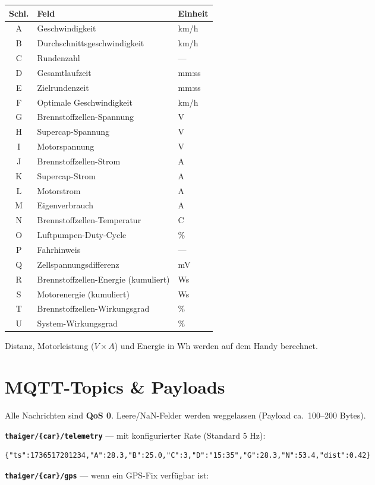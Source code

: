 \documentclass[11pt,a4paper,oneside]{report}
\newcommand{\degC}{\textdegree C}
\newcommand{\code}[1]{\texttt{#1}}
\begin{document}
\begin{tabularx}{\linewidth}{@{}clL@{}}
\toprule
\textbf{Schl.} & \textbf{Feld} & \textbf{Einheit}\\
\midrule
A & Geschwindigkeit & km/h\\
B & Durchschnittsgeschwindigkeit & km/h\\
C & Rundenzahl & ---\\
D & Gesamtlaufzeit & mm:ss\\
E & Zielrundenzeit & mm:ss\\
F & Optimale Geschwindigkeit & km/h\\
G & Brennstoffzellen-Spannung & V\\
H & Supercap-Spannung & V\\
I & Motorspannung & V\\
J & Brennstoffzellen-Strom & A\\
K & Supercap-Strom & A\\
L & Motorstrom & A\\
M & Eigenverbrauch & A\\
N & Brennstoffzellen-Temperatur & \degC{}\\
O & Luftpumpen-Duty-Cycle & \%\\
P & Fahrhinweis & ---\\
Q & Zellspannungsdifferenz & mV\\
R & Brennstoffzellen-Energie (kumuliert) & Ws\\
S & Motorenergie (kumuliert) & Ws\\
T & Brennstoffzellen-Wirkungsgrad & \%\\
U & System-Wirkungsgrad & \%\\
\bottomrule
\end{tabularx}

\medskip
Distanz, Motorleistung ($V \times A$) und Energie in Wh werden auf dem Handy
berechnet.

\section{MQTT-Topics \& Payloads}
Alle Nachrichten sind \textbf{QoS 0}. Leere/NaN-Felder werden weggelassen (Payload
ca.\ 100--200 Bytes).

\noindent\textbf{\code{thaiger/\{car\}/telemetry}} --- mit konfigurierter Rate
(Standard 5 Hz):

\begin{lstlisting}
{"ts":1736517201234,"A":28.3,"B":25.0,"C":3,"D":"15:35","G":28.3,"N":53.4,"dist":0.42}
\end{lstlisting}
\noindent\textbf{\code{thaiger/\{car\}/gps}} --- wenn ein GPS-Fix verf\"ugbar ist:
\end{document}
